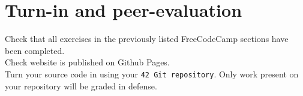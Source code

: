 \documentclass{42-en}
\begin{document}
\chapter{Turn-in and peer-evaluation}

    Check that all exercises in the previously listed FreeCodeCamp sections have been completed.\\
    
    Check website is published on Github Pages.\\

    Turn your source code in using your \texttt{42 Git repository}. Only work present on your repository will be graded in defense.

\end{document}
